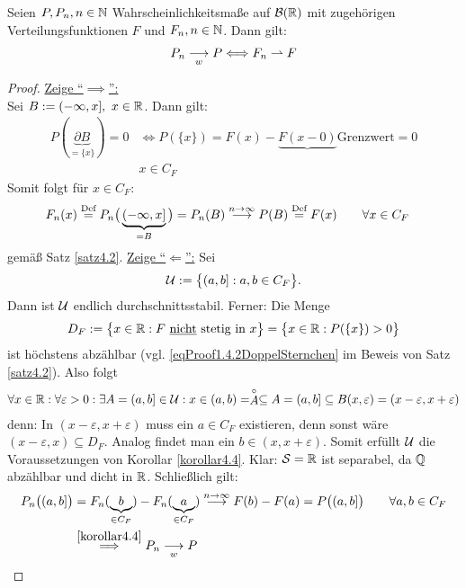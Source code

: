 \begin{korollar}\label{korollar4.5}
Seien $P,P_n,n\in\mathbb{N}$ Wahrscheinlichkeitsmaße auf $\mathcal{B}(\mathbb{R})$ mit zugehörigen Verteilungsfunktionen $F$ und $F_n,n\in\mathbb{N}$. Dann gilt:
\begin{align*}
P_n\underset{w}{\overset{}{\longrightarrow}}P
\Longleftrightarrow
F_n\rightharpoonup F
\end{align*}
\end{korollar}
\begin{proof}
\underline{Zeige ``$\implies$'':}\\
Sei $B:=(-\infty,x],~x\in\mathbb{R}$. Dann gilt:
\begin{align*}
P(\underbrace{\partial B}_{=\lbrace x\rbrace})=0
&\Longleftrightarrow P(\lbrace x\rbrace)=F(x)-\underbrace{F(x-0)}{\text{Grenzwert}}=0\\
& x\in C_F
\end{align*}
Somit folgt für $x\in C_F$:
\begin{align*}
F_n(x)&\stackrel{\text{Def}}{=}
P_n\big(\underbrace{(-\infty,x]}_{=B}\big)=P_n(B)\stackrel{n\to\infty}{\longrightarrow} P(B)\stackrel{\text{Def}}{=} F(x)\qquad\forall x\in C_F
\end{align*}
gemäß Satz \ref{satz4.2}.\nl
\underline{Zeige ``$\Longleftarrow$'':} Sei
\begin{align*}
\mathcal{U}:=\big\lbrace (a,b]:a,b\in C_F\big\rbrace.
\end{align*}
Dann ist $\mathcal{U}$ endlich durchschnittsstabil. Ferner: Die Menge 
\begin{align*}
D_F:=\big\lbrace x\in\mathbb{R}: F\text{ \underline{nicht} stetig in }x\big\rbrace
=\big\lbrace x\in\mathbb{R}:P(\lbrace x\rbrace)>0\big\rbrace
\end{align*}
ist höchstens abzählbar (vgl. \eqref{eqProof1.4.2DoppelSternchen} 
im Beweis von Satz \ref{satz4.2}). Also folgt
\begin{align*}
\forall x\in\mathbb{R}:\forall\varepsilon>0:\exists A=(a,b]\in\mathcal{U}:x\in (a,b)=\stackrel{\circ}{A}\subseteq A=(a,b]\subseteq B(x,\varepsilon)=(x-\varepsilon,x+\varepsilon)
\end{align*}
denn: In $(x-\varepsilon,x+\varepsilon)$ muss ein $a\in C_F$ existieren, denn sonst wäre $(x-\varepsilon, x)\subseteq D_F$. Analog findet man ein $b\in(x,x+\varepsilon)$. Somit erfüllt $\mathcal{U}$ die Voraussetzungen von Korollar \ref{korollar4.4}. Klar: $\mathcal{S}=\mathbb{R}$ ist separabel, da $\mathbb{Q}$ abzählbar und dicht in $\mathbb{R}$. Schließlich gilt:
\begin{align*}
P_n\big((a,b]\big)&=
F_n(\underbrace{b}_{\in C_F})-F_n(\underbrace{a}_{\in C_F})\stackrel{n\to\infty}{\longrightarrow} F(b)-F(a)=P\big((a,b]\big)\qquad\forall a,b\in C_F\\
&\stackrel{\ref{korollar4.4}}{\implies}
P_n\underset{w}{\overset{}{\longrightarrow}} P
\end{align*}
\end{proof}


